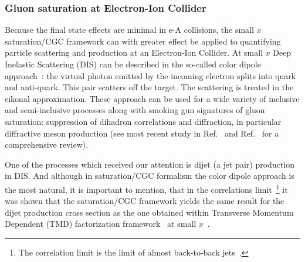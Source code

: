 %
%
%
%
%



\subsubsection*{Gluon saturation at Electron-Ion Collider} 
Because the final state effects are  minimal in e-A collisions, 
the small $x$ saturation/CGC framework can with greater effect be applied to 
quantifying particle scattering and production at an Electron-Ion Collider. 
At small $x$ Deep Inelastic Scattering (DIS) can be described in the so-called color 
dipole approach~\cite{Gunion:1976iy,Nussinov:1975mw,Nussinov:1975qb,Marquet:2009ca}: 
the virtual photon emitted by the incoming electron splits into quark and anti-quark.
This pair scatters off the target. The scattering is treated in the eikonal approximation.
These approach can be used for a wide variety of inclusive and semi-inclusive processes  
along with  smoking gun signatures of gluon saturation: suppression of dihadron 
correlations 
 and diffraction, in particular diffractive meson production 
(see most recent study in Ref.~\cite{Mantysaari:2017slo}
and Ref.~\cite{Aschenauer:2017jsk} 
for a comprehensive review). 



One of the processes which received our attention  is dijet (a jet pair) production in DIS.
And although in saturation/CGC formalism the color dipole approach is the most natural, 
it is important to mention, that in the correlations limit~\footnote{The correlation limit is  
the limit of almost back-to-back jets~\cite{Dominguez:2011wm,Dominguez:2011br}.}
it was shown that the saturation/CGC framework yields the same result for the dijet production
cross section as the one obtained within Transverse Momentum Dependent (TMD) factorization 
framework~\cite{Mulders:2000sh,Bomhof:2006dp,Meissner:2007rx} at small $x$~\cite{Metz:2011wb,Dominguez:2011wm}. 



